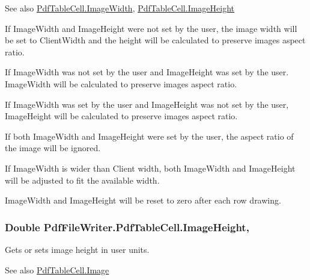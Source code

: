 \begin{DoxySeeAlso}{See also}
\hyperlink{class_pdf_file_writer_1_1_pdf_table_cell_a6d35c2558eba3fdd14e70bf88bae3624}{Pdf\+Table\+Cell.\+Image\+Width}, \hyperlink{class_pdf_file_writer_1_1_pdf_table_cell_a5fed4820bd97e61c0c81c899859665ad}{Pdf\+Table\+Cell.\+Image\+Height}


\end{DoxySeeAlso}


If Image\+Width and Image\+Height were not set by the user, the image width will be set to Client\+Width and the height will be calculated to preserve image\textquotesingle{}s aspect ratio. 

If Image\+Width was not set by the user and Image\+Height was set by the user. Image\+Width will be calculated to preserve image\textquotesingle{}s aspect ratio. 

If Image\+Width was set by the user and Image\+Height was not set by the user, Image\+Height will be calculated to preserve image\textquotesingle{}s aspect ratio. 

If both Image\+Width and Image\+Height were set by the user, the aspect ratio of the image will be ignored. 

If Image\+Width is wider than Client width, both Image\+Width and Image\+Height will be adjusted to fit the available width. 

Image\+Width and Image\+Height will be reset to zero after each row drawing. 
\subsubsection[{\texorpdfstring{Image\+Height}{ImageHeight}}]{\setlength{\rightskip}{0pt plus 5cm}Double Pdf\+File\+Writer.\+Pdf\+Table\+Cell.\+Image\+Height\hspace{0.3cm}{\ttfamily [get]}, {\ttfamily [set]}}\hypertarget{class_pdf_file_writer_1_1_pdf_table_cell_a5fed4820bd97e61c0c81c899859665ad}{}\label{class_pdf_file_writer_1_1_pdf_table_cell_a5fed4820bd97e61c0c81c899859665ad}


Gets or sets image height in user units. 

\begin{DoxySeeAlso}{See also}
\hyperlink{class_pdf_file_writer_1_1_pdf_table_cell_aae3e2b72c4d9cee9b656abdff40b13b8}{Pdf\+Table\+Cell.\+Image}


\end{DoxySeeAlso}



